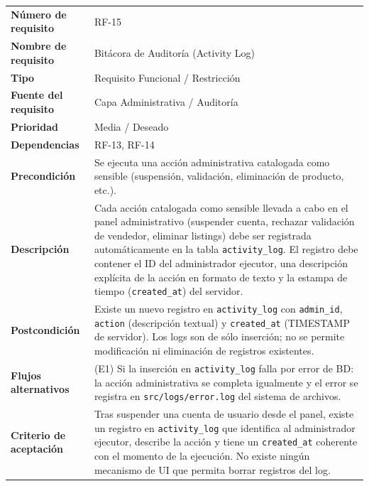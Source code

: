 \documentclass[11pt,a4paper]{report}
\begin{document}
\begin{table}[H]
\centering
\begin{tabularx}{\textwidth}{|l|L|}
\hline
{} \\ \hline
\textbf{Número de requisito} & RF-15 \\ \hline
\textbf{Nombre de requisito} & Bitácora de Auditoría (Activity Log) \\ \hline
\textbf{Tipo} & Requisito Funcional / Restricción \\ \hline
\textbf{Fuente del requisito} & Capa Administrativa / Auditoría \\ \hline
\textbf{Prioridad} & Media / Deseado \\ \hline
\textbf{Dependencias} & RF-13, RF-14 \\ \hline
\textbf{Precondición} & Se ejecuta una acción administrativa catalogada como sensible (suspensión, validación, eliminación de producto, etc.). \\ \hline
\textbf{Descripción} & Cada acción catalogada como sensible llevada a cabo en el panel administrativo (suspender cuenta, rechazar validación de vendedor, eliminar listings) debe ser registrada automáticamente en la tabla \texttt{activity\_log}. El registro debe contener el ID del administrador ejecutor, una descripción explícita de la acción en formato de texto y la estampa de tiempo (\texttt{created\_at}) del servidor. \\ \hline
\textbf{Postcondición} & Existe un nuevo registro en \texttt{activity\_log} con \texttt{admin\_id}, \texttt{action} (descripción textual) y \texttt{created\_at} (TIMESTAMP de servidor). Los logs son de sólo inserción; no se permite modificación ni eliminación de registros existentes. \\ \hline
\textbf{Flujos alternativos} & (E1) Si la inserción en \texttt{activity\_log} falla por error de BD: la acción administrativa se completa igualmente y el error se registra en \texttt{src/logs/error.log} del sistema de archivos. \\ \hline
\textbf{Criterio de aceptación} & Tras suspender una cuenta de usuario desde el panel, existe un registro en \texttt{activity\_log} que identifica al administrador ejecutor, describe la acción y tiene un \texttt{created\_at} coherente con el momento de la ejecución. No existe ningún mecanismo de UI que permita borrar registros del log. \\ \hline
\end{tabularx}
\end{table}
\end{document}
